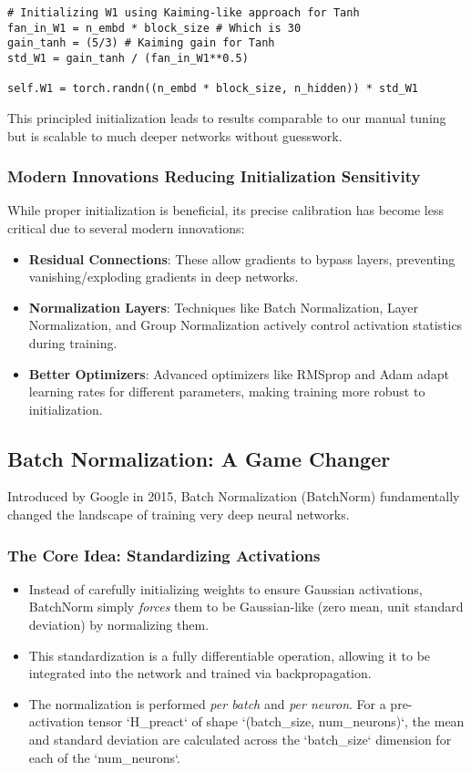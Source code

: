 \begin{lstlisting}
# Initializing W1 using Kaiming-like approach for Tanh
fan_in_W1 = n_embd * block_size # Which is 30
gain_tanh = (5/3) # Kaiming gain for Tanh
std_W1 = gain_tanh / (fan_in_W1**0.5)

self.W1 = torch.randn((n_embd * block_size, n_hidden)) * std_W1
\end{lstlisting}

This principled initialization leads to results comparable to our manual tuning but is scalable to much deeper networks without guesswork.

\subsubsection{Modern Innovations Reducing Initialization Sensitivity}
While proper initialization is beneficial, its precise calibration has become less critical due to several modern innovations:
\begin{itemize}
    \item \textbf{Residual Connections}: These allow gradients to bypass layers, preventing vanishing/exploding gradients in deep networks.
    \item \textbf{Normalization Layers}: Techniques like Batch Normalization, Layer Normalization, and Group Normalization actively control activation statistics during training.
    \item \textbf{Better Optimizers}: Advanced optimizers like RMSprop and Adam adapt learning rates for different parameters, making training more robust to initialization.
\end{itemize}

\subsection{Batch Normalization: A Game Changer}

Introduced by Google in 2015, Batch Normalization (BatchNorm) fundamentally changed the landscape of training very deep neural networks.

\subsubsection{The Core Idea: Standardizing Activations}
\begin{itemize}
    \item Instead of carefully initializing weights to ensure Gaussian activations, BatchNorm simply \textit{forces} them to be Gaussian-like (zero mean, unit standard deviation) by normalizing them.
    \item This standardization is a fully differentiable operation, allowing it to be integrated into the network and trained via backpropagation.
    \item The normalization is performed \textit{per batch} and \textit{per neuron}. For a pre-activation tensor `H_preact` of shape `(batch_size, num_neurons)`, the mean and standard deviation are calculated across the `batch_size` dimension for each of the `num_neurons`.
\end{itemize}

